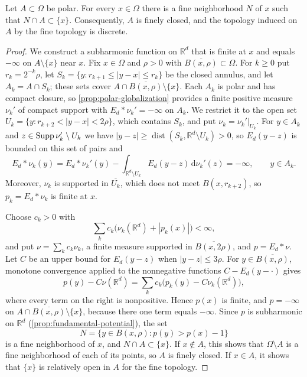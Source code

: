 \begin{proposition}\label{prop:polar-fine-discrete}
Let $A\subset\Omega$ be polar. For every $x\in\Omega$ there is a fine neighborhood $N$ of $x$ such that $N\cap A\subset\{x\}$. Consequently, $A$ is finely closed, and the topology induced on $A$ by the fine topology is discrete.
\end{proposition}
\begin{proof}
We construct a subharmonic function on $\mathbb R^d$ that is finite at $x$ and equals $-\infty$ on $A\setminus\{x\}$ near $x$. Fix $x\in\Omega$ and $\rho>0$ with $\overline{B(x,\rho)}\subset\Omega$. For $k\geq0$ put $r_k=2^{-k}\rho$, let $S_k=\{y:r_{k+1}\leq|y-x|\leq r_k\}$ be the closed annulus, and let $A_k=A\cap S_k$; these sets cover $A\cap\overline{B(x,\rho)}\setminus\{x\}$. Each $A_k$ is polar and has compact closure, so \cref{prop:polar-globalization} provides a finite positive measure $\nu_k'$ of compact support with $E_d*\nu_k'=-\infty$ on $A_k$. We restrict it to the open set $U_k=\{y:r_{k+2}<|y-x|<2\rho\}$, which contains $S_k$, and put $\nu_k=\nu_k'|_{U_k}$. For $y\in A_k$ and $z\in\operatorname{Supp}\nu_k'\setminus U_k$ we have $|y-z|\geq\operatorname{dist}(S_k,\mathbb R^d\setminus U_k)>0$, so $E_d(y-z)$ is bounded on this set of pairs and
\[
 E_d*\nu_k(y)=E_d*\nu_k'(y)-\int_{\mathbb R^d\setminus U_k}E_d(y-z)\,\mathrm d\nu_k'(z)=-\infty,\qquad y\in A_k.
\]
Moreover, $\nu_k$ is supported in $\overline{U_k}$, which does not meet $B(x,r_{k+2})$, so $p_k=E_d*\nu_k$ is finite at $x$.

Choose $c_k>0$ with
\[
 \sum_kc_k\bigl(\nu_k(\mathbb R^d)+|p_k(x)|\bigr)<\infty,
\]
and put $\nu=\sum_kc_k\nu_k$, a finite measure supported in $\overline{B(x,2\rho)}$, and $p=E_d*\nu$. Let $C$ be an upper bound for $E_d(y-z)$ when $|y-z|\leq3\rho$. For $y\in\overline{B(x,\rho)}$, monotone convergence applied to the nonnegative functions $C-E_d(y-\cdot)$ gives
\[
 p(y)-C\nu(\mathbb R^d)=\sum_kc_k\bigl(p_k(y)-C\nu_k(\mathbb R^d)\bigr),
\]
where every term on the right is nonpositive. Hence $p(x)$ is finite, and $p=-\infty$ on $A\cap\overline{B(x,\rho)}\setminus\{x\}$, because there one term equals $-\infty$. Since $p$ is subharmonic on $\mathbb R^d$ (\cref{prop:fundamental-potential}), the set
\[
 N=\{y\in B(x,\rho):p(y)>p(x)-1\}
\]
is a fine neighborhood of $x$, and $N\cap A\subset\{x\}$. If $x\notin A$, this shows that $\Omega\setminus A$ is a fine neighborhood of each of its points, so $A$ is finely closed. If $x\in A$, it shows that $\{x\}$ is relatively open in $A$ for the fine topology.
\end{proof}

